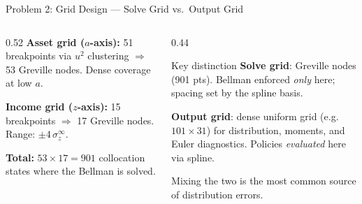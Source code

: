 \documentclass[aspectratio=169,11pt]{beamer}
\begin{document}
\begin{frame}[shrink=8]{Problem 2: Grid Design --- Solve Grid vs.\ Output Grid}
    \vspace{-0.2em}
    \begin{columns}[T]
        \begin{column}{0.52\textwidth}
            \small\textbf{Asset grid ($a$-axis):} 51 breakpoints via $u^2$ clustering $\Rightarrow$ 53 Greville nodes. Dense coverage at low $a$.

            \vspace{0.2em}
            \small\textbf{Income grid ($z$-axis):} 15 breakpoints $\Rightarrow$ 17 Greville nodes. Range: $\pm 4\,\sigma_z^\infty$.

            \vspace{0.2em}
            \small\textbf{Total:} $53\!\times\!17 = 901$ collocation states where the Bellman is solved.
        \end{column}
        \begin{column}{0.44\textwidth}
            \begin{alertblock}{Key distinction}
                \small
                \textbf{Solve grid}: Greville nodes (901 pts). Bellman enforced \textit{only} here; spacing set by the spline basis.

                \vspace{0.15em}
                \textbf{Output grid}: dense uniform grid (e.g.\ $101\!\times\!31$) for distribution, moments, and Euler diagnostics. Policies \textit{evaluated} here via spline.

                \vspace{0.15em}
                Mixing the two is the most common source of distribution errors.
            \end{alertblock}
        \end{column}
    \end{columns}
\end{frame}
\end{document}
